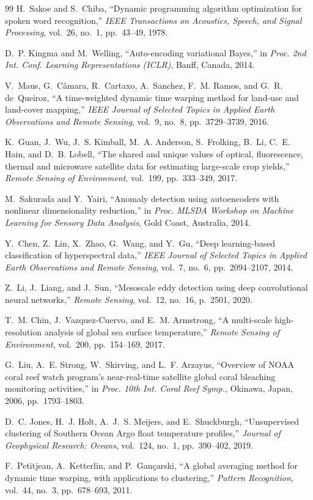 \documentclass[journal]{IEEEtran}
\begin{document}
\begin{thebibliography}{99}
H.~Sakoe and S.~Chiba,
``Dynamic programming algorithm optimization for spoken word
recognition,'' \textit{IEEE Transactions on Acoustics, Speech,
and Signal Processing}, vol.~26, no.~1, pp.~43--49, 1978.

D.~P. Kingma and M.~Welling,
``Auto-encoding variational Bayes,''
in \textit{Proc. 2nd Int. Conf. Learning Representations
(ICLR)}, Banff, Canada, 2014.

V.~Maus, G.~C\^{a}mara, R.~Cartaxo, A.~Sanchez,
F.~M. Ramos, and G.~R. de~Queiroz,
``A time-weighted dynamic time warping method for land-use and
land-cover mapping,'' \textit{IEEE Journal of Selected Topics
in Applied Earth Observations and Remote Sensing}, vol.~9,
no.~8, pp.~3729--3739, 2016.

K.~Guan, J.~Wu, J.~S. Kimball, M.~A. Anderson, S.~Frolking,
B.~Li, C.~E. Hain, and D.~B. Lobell,
``The shared and unique values of optical, fluorescence,
thermal and microwave satellite data for estimating
large-scale crop yields,''
\textit{Remote Sensing of Environment}, vol.~199,
pp.~333--349, 2017.

M.~Sakurada and Y.~Yairi,
``Anomaly detection using autoencoders with nonlinear
dimensionality reduction,''
in \textit{Proc. MLSDA Workshop on Machine Learning for
Sensory Data Analysis}, Gold Coast, Australia, 2014.

Y.~Chen, Z.~Lin, X.~Zhao, G.~Wang, and Y.~Gu,
``Deep learning-based classification of hyperspectral data,''
\textit{IEEE Journal of Selected Topics in Applied Earth
Observations and Remote Sensing}, vol.~7, no.~6,
pp.~2094--2107, 2014.

Z.~Li, J.~Liang, and J.~Sun,
``Mesoscale eddy detection using deep convolutional neural
networks,'' \textit{Remote Sensing}, vol.~12, no.~16,
p.~2501, 2020.

T.~M. Chin, J.~Vazquez-Cuervo, and E.~M. Armstrong,
``A multi-scale high-resolution analysis of global sea surface
temperature,'' \textit{Remote Sensing of Environment},
vol.~200, pp.~154--169, 2017.

G.~Liu, A.~E. Strong, W.~Skirving, and L.~F. Arzayus,
``Overview of NOAA coral reef watch program's near-real-time
satellite global coral bleaching monitoring activities,''
in \textit{Proc. 10th Int. Coral Reef Symp.},
Okinawa, Japan, 2006, pp.~1793--1803.

D.~C. Jones, H.~J. Holt, A.~J.~S. Meijers,
and E.~Shuckburgh,
``Unsupervised clustering of Southern Ocean Argo float
temperature profiles,'' \textit{Journal of Geophysical
Research: Oceans}, vol.~124, no.~1, pp.~390--402, 2019.

F.~Petitjean, A.~Ketterlin, and P.~Gan\c{c}arski,
``A global averaging method for dynamic time warping,
with applications to clustering,''
\textit{Pattern Recognition}, vol.~44, no.~3,
pp.~678--693, 2011.

\end{thebibliography}
\end{document}
